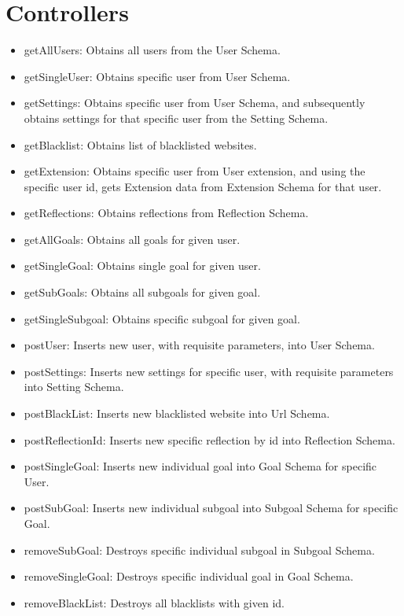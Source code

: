 \documentclass[letterpaper, 10 pt]{report}
\begin{document}
\section{Controllers}
\begin{itemize}
 \item getAllUsers: Obtains all users from the User Schema.
 \item getSingleUser: Obtains specific user from User Schema.
 \item getSettings: Obtains specific user from User Schema, and subsequently obtains settings for that specific user from the Setting Schema.
 \item getBlacklist: Obtains list of blacklisted websites.
 \item getExtension: Obtains specific user from User extension, and using the specific user id, gets Extension data from Extension Schema for that user.
 \item getReflections: Obtains reflections from Reflection Schema.
 \item getAllGoals: Obtains all goals for given user.
 \item getSingleGoal: Obtains single goal for given user.
 \item getSubGoals: Obtains all subgoals for given goal.
 \item getSingleSubgoal: Obtains specific subgoal for given goal.
 
 \item postUser: Inserts new user, with requisite parameters, into User Schema.
 \item postSettings: Inserts new settings for specific user, with requisite parameters into Setting Schema.
 \item postBlackList: Inserts new blacklisted website into Url Schema.
 \item postReflectionId: Inserts new specific reflection by id into Reflection Schema.
 \item postSingleGoal: Inserts new individual goal into Goal Schema for specific User.
 \item postSubGoal: Inserts new individual subgoal into Subgoal Schema for specific Goal.
 
 \item removeSubGoal: Destroys specific individual subgoal in Subgoal Schema.
 \item removeSingleGoal: Destroys specific individual goal in Goal Schema.
 \item removeBlackList: Destroys all blacklists with given id.
 

\end{itemize}
\end{document}
